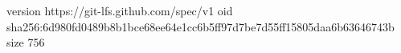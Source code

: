 version https://git-lfs.github.com/spec/v1
oid sha256:6d980fd0489b8b1bce68ee64e1cc6b5ff97d7be7d55ff15805daa6b63646743b
size 756
